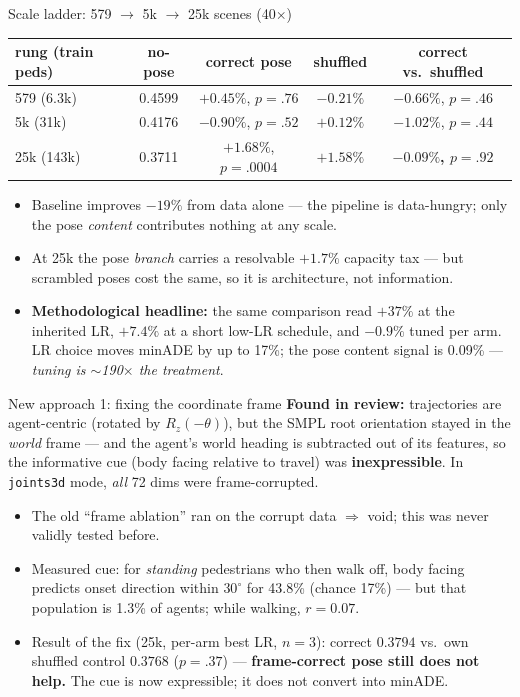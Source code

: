 \documentclass[10pt,aspectratio=169]{beamer}
\newcommand{\ok}[1]{\textcolor{good}{#1}}
\newcommand{\no}[1]{\textcolor{bad}{#1}}
\begin{document}
\begin{frame}{Scale ladder: 579 $\to$ 5k $\to$ 25k scenes (40$\times$)}
\begin{center}\small
\begin{tabular}{lcccc}
\toprule
rung (train peds) & no-pose & correct pose & shuffled & correct vs.\ shuffled \\
\midrule
579 (6.3k)  & 0.4599 & $+0.45\%$, $p{=}.76$ & $-0.21\%$ & $-0.66\%$, $p{=}.46$ \\
5k (31k)    & 0.4176 & $-0.90\%$, $p{=}.52$ & $+0.12\%$ & $-1.02\%$, $p{=}.44$ \\
25k (143k)  & 0.3711 & $+1.68\%$, $p{=}.0004$ & $+1.58\%$ & \textbf{$-0.09\%$, $p{=}.92$} \\
\bottomrule
\end{tabular}
\end{center}
\begin{itemize}
  \item Baseline improves \ok{$-19\%$} from data alone --- the pipeline is data-hungry;
        only the pose \emph{content} contributes nothing at any scale.
  \item At 25k the pose \emph{branch} carries a resolvable $+1.7\%$ capacity tax --- but
        scrambled poses cost the same, so it is architecture, not information.
  \item \textbf{Methodological headline:} the same comparison read \no{$+37\%$} at the
        inherited LR, $+7.4\%$ at a short low-LR schedule, and $-0.9\%$ tuned per arm.
        LR choice moves minADE by up to 17\%; the pose content signal is 0.09\% ---
        \emph{tuning is $\sim$190$\times$ the treatment}.
\end{itemize}
\end{frame}

\begin{frame}{New approach 1: fixing the coordinate frame}
\textbf{Found in review:} trajectories are agent-centric (rotated by $R_z(-\theta)$), but the
SMPL root orientation stayed in the \emph{world} frame --- and the agent's world heading is
subtracted out of its features, so the informative cue (body facing relative to travel) was
\textbf{inexpressible}. In \texttt{joints3d} mode, \emph{all} 72 dims were frame-corrupted.
\begin{itemize}
  \item The old ``frame ablation'' ran on the corrupt data $\Rightarrow$ void; this was
        never validly tested before.
  \item Measured cue: for \emph{standing} pedestrians who then walk off, body facing
        predicts onset direction within $30^\circ$ for \ok{43.8\%} (chance 17\%) --- but
        that population is 1.3\% of agents; while walking, $r{=}0.07$.
  \item Result of the fix (25k, per-arm best LR, $n{=}3$): correct $0.3794$ vs.\ own
        shuffled control $0.3768$ ($p{=}.37$) --- \textbf{frame-correct pose still does not help.}
        The cue is now expressible; it does not convert into minADE.
\end{itemize}
\end{frame}
\end{document}
